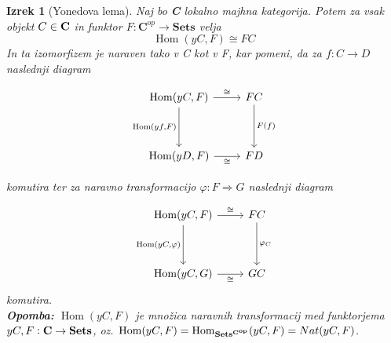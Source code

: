\documentclass[12pt,a4paper]{book}
\theoremstyle{definition}
\theoremstyle{plain}
\newtheorem{izrek}[definicija]{Izrek}
\theoremstyle{definition}
\theoremstyle{remark}
\DeclareMathOperator{\Hom}{Hom}
\begin{document}
\begin{izrek}[Yonedova lema]
Naj bo {\bf C} lokalno majhna kategorija. Potem za vsak objekt $C \in \bf{C}$ in funktor $F : \textbf{C}^{op} \to \textbf{Sets}$ velja
$$\Hom(yC,F) \cong FC$$
In ta izomorfizem je naraven tako v C kot v F, kar pomeni, da za $f : C \to D$ naslednji diagram

\begin{equation} \label{diag1}
\begin{tikzcd}[row sep=huge]
\Hom(yC,F) \arrow[r, "\cong"] \arrow[d, "{\Hom(yf,F)}"'] & FC \arrow[d, "F(f)"] \\
\Hom(yD,F) \arrow[r, "\cong"'] & FD
\end{tikzcd}
\end{equation}


komutira ter za naravno transformacijo $\varphi : F \Rightarrow G$ naslednji diagram

\begin{equation} \label{diag2}
\begin{tikzcd}[row sep=huge]
\Hom(yC,F) \arrow[r, "\cong"] \arrow[d, "{\Hom(yC,}\varphi\text{)}"'] & FC \arrow[d, "\varphi_C"] \\
\Hom(yC,G) \arrow[r, "\cong"']	&	GC
\end{tikzcd}
\end{equation}
komutira. \\
\textbf{Opomba:} $\Hom(yC,F)$ je množica naravnih transformacij med funktorjema $yC,F : \bf{C} \to \bf{Sets}$, oz. $\Hom(yC,F) = \Hom_{\bf{Sets}^{\textbf{C}^{op}}}(yC,F) = Nat(yC,F)$.

\end{izrek}
\end{document}
